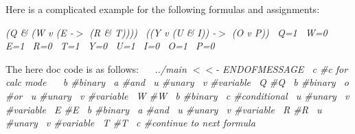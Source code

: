 Here is a complicated example for the following formulas and assignments\+:

{\itshape  {\ttfamily  (Q \& (W v (E -\/$>$ (R \& T))))~\newline
 ((Y v (U \& I)) -\/$>$ (O v P))~\newline
 Q=1~\newline
 W=0~\newline
 E=1~\newline
 R=0~\newline
 T=1~\newline
 Y=0~\newline
 U=1~\newline
 I=0~\newline
 O=1~\newline
 P=0~\newline
 } }

The here doc code is as follows\+:~\newline
~\newline
 {\itshape  {\ttfamily  ../main $<$$<$-\/ E\+N\+D\+O\+F\+M\+E\+S\+S\+A\+GE~\newline
 c \#c for calc mode~\newline
 ~\newline
 b \#binary~\newline
 a \#and~\newline
 u \#unary~\newline
 v \#variable~\newline
 Q \#Q~\newline
 b \#binary~\newline
 o \#or~\newline
 u \#unary~\newline
 v \#variable~\newline
 W \#W~\newline
 b \#binary~\newline
 c \#conditional~\newline
 u \#unary~\newline
 v \#variable~\newline
 E \#E~\newline
 b \#binary~\newline
 a \#and~\newline
 u \#unary~\newline
 v \#variable~\newline
 R \#R~\newline
 u \#unary~\newline
 v \#variable~\newline
 T \#T~\newline
 c \#continue to next formula~\newline
}}

